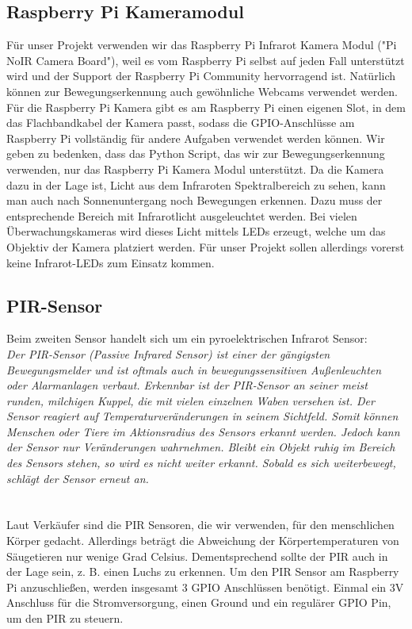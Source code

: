 \documentclass[journal]{IEEEtran}
\begin{document}
\subsection{Raspberry Pi Kameramodul}
Für unser Projekt verwenden wir das Raspberry Pi Infrarot Kamera Modul ("Pi NoIR Camera Board"), weil es vom Raspberry Pi selbst auf jeden Fall unterstützt wird und der Support der Raspberry Pi Community hervorragend ist. 
Natürlich können zur Bewegungserkennung auch gewöhnliche Webcams verwendet werden. 
Für die Raspberry Pi Kamera gibt es am Raspberry Pi einen eigenen Slot, in dem das Flachbandkabel der Kamera passt, sodass die GPIO-Anschlüsse am Raspberry Pi vollständig für andere Aufgaben verwendet werden können.
Wir geben zu bedenken, dass das Python Script, das wir zur Bewegungserkennung verwenden, nur das Raspberry Pi Kamera Modul unterstützt. 
Da die Kamera dazu in der Lage ist, Licht aus dem Infraroten Spektralbereich zu sehen, kann man auch nach Sonnenuntergang noch Bewegungen erkennen.
Dazu muss der entsprechende Bereich mit Infrarotlicht ausgeleuchtet werden.
Bei vielen Überwachungskameras wird dieses Licht mittels LEDs erzeugt, welche um das Objektiv der Kamera platziert werden.
Für unser Projekt sollen allerdings vorerst keine Infrarot-LEDs zum Einsatz kommen.

\subsection{PIR-Sensor}
Beim zweiten Sensor handelt sich um ein pyroelektrischen Infrarot Sensor:\\
\textit{Der PIR-Sensor (Passive Infrared Sensor) ist einer der gängigsten Bewegungsmelder und ist oftmals auch in bewegungssensitiven Außenleuchten oder Alarmanlagen verbaut.
Erkennbar ist der PIR-Sensor an seiner meist runden, milchigen Kuppel, die mit vielen einzelnen Waben versehen ist. 
Der Sensor reagiert auf Temperaturveränderungen in seinem Sichtfeld. 
Somit können Menschen oder Tiere im Aktionsradius des Sensors erkannt werden. 
Jedoch kann der Sensor nur Veränderungen wahrnehmen. 
Bleibt ein Objekt ruhig im Bereich des Sensors stehen, so wird es nicht weiter erkannt. 
Sobald es sich weiterbewegt, schlägt der Sensor erneut an.}\cite[S. 493]{Raspi}\\ \\
\\
Laut Verkäufer sind die PIR Sensoren, die wir verwenden, für den menschlichen Körper gedacht. 
Allerdings beträgt die Abweichung der Körpertemperaturen von Säugetieren nur wenige Grad Celsius.
Dementsprechend sollte der PIR auch in der Lage sein, z. B. einen Luchs zu erkennen.
Um den PIR Sensor am Raspberry Pi anzuschließen, werden insgesamt 3 GPIO Anschlüssen benötigt.
Einmal ein 3V Anschluss für die Stromversorgung, einen Ground und ein regulärer GPIO Pin, um den PIR zu steuern.
\end{document}
